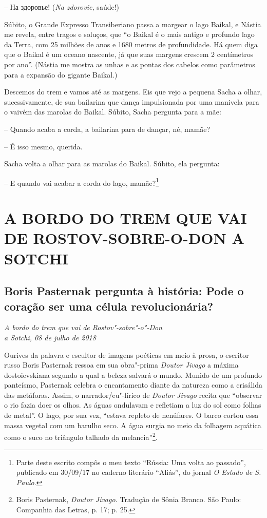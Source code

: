 -- На здоровье! (\emph{Na zdorovie,} saúde!)

Súbito, o Grande Expresso Transiberiano passa a margear o lago Baikal, e
Nástia me revela, entre tragos e soluços, que ``o Baikal é o mais antigo
e profundo lago da Terra, com 25 milhões de anos e 1680 metros de
profundidade. Há quem diga que o Baikal é um oceano nascente, já que
suas margens crescem 2 centímetros por ano''. (Nástia me mostra as unhas
e as pontas dos cabelos como parâmetros para a expansão do gigante
Baikal.)

Descemos do trem e vamos até as margens. Eis que vejo a pequena Sacha a
olhar, sucessivamente, de sua bailarina que dança impulsionada por uma
manivela para o vaivém das marolas do Baikal. Súbito, Sacha pergunta
para a mãe:

-- Quando acaba a corda, a bailarina para de dançar, né, mamãe?

-- É isso mesmo, querida.

Sacha volta a olhar para as marolas do Baikal. Súbito, ela pergunta:

-- E quando vai acabar a corda do lago, mamãe?\footnote{Parte deste
  escrito compôs o meu texto ``Rússia: Uma volta ao passado'', publicado
  em 30/09/17 no caderno literário ``Aliás'', do jornal \emph{O Estado
  de S. Paulo}.}

\clearpage{\pagestyle{empty}\cleardoublepage}
\movetooddpage
{}
\part*{A BORDO DO TREM QUE VAI DE ROSTOV-SOBRE-O-DON A SOTCHI}

\chapter*{Boris Pasternak pergunta à história: Pode o coração ser uma célula revolucionária?}

\begin{flushright}
\emph{A bordo do trem que vai de Rostov"-sobre"-o"-Don\\a Sotchi, 08 de julho de
2018}
\end{flushright}

Ourives da palavra e escultor de imagens poéticas em meio à prosa, o
escritor russo Boris Pasternak ressoa em sua obra"-prima \emph{Doutor
Jivago} a máxima dostoievskiana segundo a qual a beleza salvará o mundo.
Munido de um profundo panteísmo, Pasternak celebra o encantamento diante
da natureza como a crisálida das metáforas. Assim, o narrador/eu"-lírico
de \emph{Doutor Jivago} recita que ``observar o rio fazia doer os olhos.
As águas ondulavam e refletiam a luz do sol como folhas de metal''. O
lago, por sua vez, ``estava repleto de nenúfares. O barco cortou essa
massa vegetal com um barulho seco. A água surgia no meio da folhagem
aquática como o suco no triângulo talhado da melancia''\footnote{Boris
  Pasternak, \emph{Doutor Jivago.} Tradução de Sônia Branco. São Paulo:
  Companhia das Letras, p. 17; p. 25.}.

